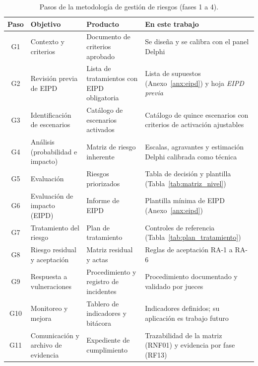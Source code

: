 \begin{table}[htbp]
  \centering
  \caption{Pasos de la metodología de gestión de riesgos (fases 1 a 4).}
  \label{tab:pasos_gestion}
  \scriptsize
  \renewcommand{\arraystretch}{1.12}
  \begin{tabularx}{\textwidth}{|c|>{\raggedright\arraybackslash}p{3.0cm}|>{\raggedright\arraybackslash}p{3.4cm}|L|}
    \hline
    \textbf{Paso} & \textbf{Objetivo} & \textbf{Producto} & \textbf{En este trabajo} \\
    \hline
    G1 & Contexto y criterios & Documento de criterios aprobado & Se diseña y se calibra con el panel Delphi \\ \hline
    G2 & Revisión previa de EIPD & Lista de tratamientos con EIPD obligatoria & Lista de supuestos (Anexo~\ref{anx:eipd}) y hoja \textit{EIPD previa} \\ \hline
    G3 & Identificación de escenarios & Catálogo de escenarios activados & Catálogo de quince escenarios con criterios de activación ajustables \\ \hline
    G4 & Análisis (probabilidad e impacto) & Matriz de riesgo inherente & Escalas, agravantes y estimación Delphi calibrada como técnica \\ \hline
    G5 & Evaluación & Riesgos priorizados & Tabla de decisión y plantilla (Tabla~\ref{tab:matriz_nivel}) \\ \hline
    G6 & Evaluación de impacto (EIPD) & Informe de EIPD & Plantilla mínima de EIPD (Anexo~\ref{anx:eipd}) \\ \hline
    G7 & Tratamiento del riesgo & Plan de tratamiento & Controles de referencia (Tabla~\ref{tab:plan_tratamiento}) \\ \hline
    G8 & Riesgo residual y aceptación & Matriz residual y actas & Reglas de aceptación RA-1 a RA-6 \\ \hline
    G9 & Respuesta a vulneraciones & Procedimiento y registro de incidentes & Procedimiento documentado y validado por jueces \\ \hline
    G10 & Monitoreo y mejora & Tablero de indicadores y bitácora & Indicadores definidos; su aplicación es trabajo futuro \\ \hline
    G11 & Comunicación y archivo de evidencia & Expediente de cumplimiento & Trazabilidad de la matriz (RNF01) y evidencia por fase (RF13) \\ \hline
  \end{tabularx}
  \raggedright
\end{table}

